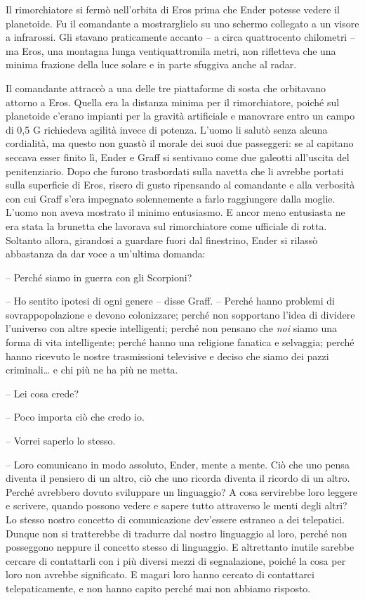 {Il rimorchiatore si fermò nell'orbita di Eros prima che Ender potesse
	vedere il planetoide. Fu il comandante a mostrarglielo su uno schermo
	collegato a un visore a infrarossi. Gli stavano praticamente accanto --
	a circa quattrocento chilometri -- ma Eros, una montagna lunga
	ventiquattromila metri, non rifletteva che una minima frazione della
	luce solare e in parte sfuggiva anche al radar.}

{Il comandante attraccò a una delle tre piattaforme di sosta che
	orbitavano attorno a Eros. Quella era la distanza minima per il
	rimorchiatore, poiché sul planetoide c'erano impianti per la gravità
	artificiale e manovrare entro un campo di 0,5 G richiedeva agilità
	invece di potenza. L'uomo li salutò senza alcuna cordialità, ma questo
	non guastò il morale dei suoi due passeggeri: se al capitano seccava
	esser finito lì, Ender e Graff si sentivano come due galeotti all'uscita
	del penitenziario. Dopo che furono trasbordati sulla navetta che li
	avrebbe portati sulla superficie di Eros, risero di gusto ripensando al
	comandante e alla verbosità con cui Graff s'era impegnato solennemente a
	farlo raggiungere dalla moglie. L'uomo non aveva mostrato il minimo
	entusiasmo. E ancor meno entusiasta ne era stata la brunetta che
	lavorava sul rimorchiatore come ufficiale di rotta. Soltanto allora,
	girandosi a guardare fuori dal finestrino, Ender si rilassò abbastanza
	da dar voce a un'ultima domanda:}

{-- Perché siamo in guerra con gli Scorpioni?}

{-- Ho sentito ipotesi di ogni genere -- disse Graff. -- Perché hanno
	problemi di sovrappopolazione e devono colonizzare; perché non
	sopportano l'idea di dividere l'universo con altre specie intelligenti;
	perché non pensano che \emph{noi} siamo una forma di vita intelligente;
	perché hanno una religione fanatica e selvaggia; perché hanno ricevuto
	le nostre trasmissioni televisive e deciso che siamo dei pazzi
	criminali\ldots{} e chi più ne ha più ne metta.}

{-- Lei cosa crede?}

{-- Poco importa ciò che credo io.}

{-- Vorrei saperlo lo stesso.}

{-- Loro comunicano in modo assoluto, Ender, mente a mente. Ciò che uno
	pensa diventa il pensiero di un altro, ciò che uno ricorda diventa il
	ricordo di un altro. Perché avrebbero dovuto sviluppare un linguaggio? A
	cosa servirebbe loro leggere e scrivere, quando possono vedere e sapere
	tutto attraverso le menti degli altri? Lo stesso nostro concetto di
	comunicazione dev'essere estraneo a dei telepatici. Dunque non si
	tratterebbe di tradurre dal nostro linguaggio al loro, perché non
	posseggono neppure il concetto stesso di linguaggio. E altrettanto
	inutile sarebbe cercare di contattarli con i più diversi mezzi di
	segnalazione, poiché la cosa per loro non avrebbe significato. E magari
	loro hanno cercato di contattarci telepaticamente, e non hanno capito
	perché mai non abbiamo risposto.}

